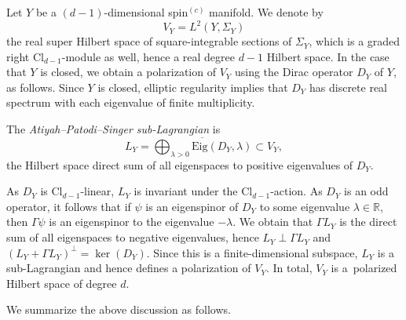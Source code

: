 \documentclass[10pt,a4paper]{amsart}
\numberwithin{equation}{section}
\newcommand{\R}{\mathbb{R}}
\newcommand{\Cl}{\mathrm{Cl}}
\begin{document}
Let $Y$ be a $(d-1)$-dimensional spin$^{(c)}$ manifold.
We denote by
\begin{equation*}%
V_{Y} = L^2(Y, \Sigma_Y)
\end{equation*}
the real super Hilbert space of square-integrable sections of $\Sigma_Y$, which is a graded right $\Cl_{d-1}$-module as well, hence a real degree $d-1$ Hilbert space.
In the case that $Y$ is closed, we obtain a polarization of $V_Y$ using the Dirac operator $D_Y$ of $Y$, as follows.
Since $Y$ is closed, elliptic regularity implies that $D_Y$ has discrete real spectrum with each eigenvalue of finite multiplicity.

\begin{Definition}
\label{DefinitionAPSLagrangian}
The \emph{Atiyah--Patodi--Singer sub-Lagrangian} is
\begin{equation} \label{APSLagrangian}
 L_Y = \overline{\bigoplus_{\lambda > 0} \mathrm{Eig}(D_Y, \lambda)}\subset V_Y,
\end{equation}
the Hilbert space direct sum of all eigenspaces to positive eigenvalues of $D_Y$.
\end{Definition}

As $D_Y$ is $\Cl_{d-1}$-linear, $L_Y$ is invariant under the $\Cl_{d-1}$-action.
As $D_Y$ is an odd operator, it follows that if $\psi$ is an eigenspinor of $D_Y$ to some eigenvalue $\lambda \in \R$, then $\Gamma \psi$ is an eigenspinor to the eigenvalue $-\lambda$.
We obtain that $\Gamma L_Y$ is the direct sum of all eigenspaces to negative eigenvalues, hence $L_Y \perp \Gamma L_Y$ and $(L_Y + \Gamma L_Y)^\perp = \ker(D_Y)$.
Since this is a finite-dimensional subspace, $L_Y$ is a sub-Lagrangian and hence defines a polarization of $V_Y$.
In total, $V_Y$ is a~polarized Hilbert space of degree $d$.

We summarize the above discussion as follows.
\end{document}
